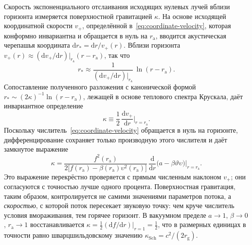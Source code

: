 \documentclass[12pt,a4paper,preprint]{elsarticle}
\begin{document}
            Скорость экспоненциального отслаивания исходящих нулевых лучей вблизи горизонта измеряется поверхностной гравитацией $\kappa$. На основе исходящей координатной скорости $v_{+}$, определённой в~\eqref{eq:coordinate-velocity}, которая конформно инвариантна и обращается в нуль на $r_{\mathrm{a}}$, вводится акустическая черепашья координата $\mathrm{d}r_{*}=\mathrm{d}r/v_{+}(r)$. Вблизи горизонта $v_{+}(r)\approx (\mathrm{d}v_{+}/\mathrm{d}r)|_{r_{\mathrm{a}}}(r-r_{\mathrm{a}})$, так что
            \begin{equation}
                r_{*} \approx \frac{1}{(\mathrm{d}v_{+}/\mathrm{d}r)|_{r_{\mathrm{a}}}}\,\ln(r-r_{\mathrm{a}}) .
                \label{eq:tortoise-near-horizon}
            \end{equation}
            Сопоставление полученного разложения с канонической формой $r_{*}\sim(2\kappa)^{-1}\ln(r-r_{\mathrm{a}})$, лежащей в основе теплового спектра Крускала, даёт инвариантное определение
            \begin{equation}
                \kappa \equiv \frac{1}{2}\,\frac{\mathrm{d}v_{+}}{\mathrm{d}r}\Big|_{r=r_{\mathrm{a}}} .
                \label{eq:surface-gravity-def}
            \end{equation}
            Поскольку числитель~\eqref{eq:coordinate-velocity} обращается в нуль на горизонте, дифференцирование сохраняет только производную этого числителя и даёт замкнутое выражение
            \begin{equation}
                \kappa = \frac{f^{2}(r_{\mathrm{a}})} {2\bigl[f(r_{\mathrm{a}})-\beta(r_{\mathrm{a}})\upsilon^{2}(r_{\mathrm{a}})\bigr]} \,\frac{\mathrm{d}}{\mathrm{d}r}\bigl(a-\beta\vartheta\upsilon\bigr)\Big|_{r=r_{\mathrm{a}}} .
                \label{eq:surface-gravity-explicit}
            \end{equation}
            Это выражение перекрёстно проверяется с прямым численным наклоном $v_{+}$; они согласуются с точностью лучше одного процента. Поверхностная гравитация, таким образом, контролируется не самими значениями параметров потока, а \emph{скоростью}, с которой поток пересекает звуковую точку: чем круче числитель условия вмораживания, тем горячее горизонт. В вакуумном пределе $a\to 1$, $\beta\to 0$, $r_{\mathrm{a}}\to 1$ восстанавливается $\kappa=\frac{1}{2}(\mathrm{d}f/\mathrm{d}r)|_{r=1}=\frac{1}{2}$, что в размерных единицах в точности равно шварцшильдовскому значению $\kappa_{\mathrm{Sch}}=c^{2}/(2r_{\mathrm{g}})$.
\end{document}

